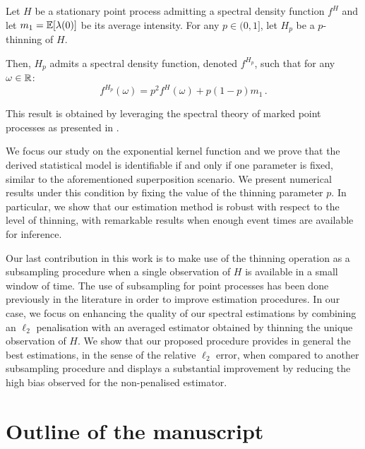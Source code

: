     \begin{proposition}\label{prop:chap0_spectral_thinning}
      Let $H$ be a stationary point process admitting a spectral density function $f^H$ and let $m_1={\mathbb E}[\lambda(0)]$ be its average intensity.
      For any $p\in(0,1]$, let $H_p$ be a $p$-thinning of $H$.
  
      Then, $H_p$ admits a spectral density function, denoted $f^{H_p}$, such that for any $\omega\in{\mathbb R}$:
      \begin{equation}\label{eq:chap0_spectral_thinning}
          f^{H_p}(\omega) = p^2 f^H(\omega) + p(1-p)m_1\,.
      \end{equation}
  
  \end{proposition}
    This result is obtained by leveraging the spectral theory of marked point processes as presented in \textcite{Bremaud2005}.

    We focus our study on the exponential kernel function and we prove that the derived statistical model is identifiable if and only if one parameter is fixed, similar to the aforementioned superposition scenario.
    We present numerical results under this condition by fixing the value of the thinning parameter $p$. 
    In particular, we show that our estimation method is robust with respect to the level of thinning, with remarkable results when enough event times are available for inference.
    
    Our last contribution in this work is to make use of the thinning operation as a subsampling procedure when a single observation of $H$ is available in a small window of time.
    The use of subsampling for point processes has been done previously in the literature \parencite{Moller2003, Cronie2024} in order to improve estimation procedures.
    In our case, we focus on enhancing the quality of our spectral estimations by combining an $\ell_2$ penalisation with an averaged estimator obtained by thinning the unique observation of $H$.
    We show that our proposed procedure provides in general the best estimations, in the sense of the relative $\ell_2$ error, when compared to another subsampling procedure and displays a substantial improvement by reducing the high bias observed for the non-penalised estimator.
    
\section{Outline of the manuscript}\label{sec:chap0_outline}

